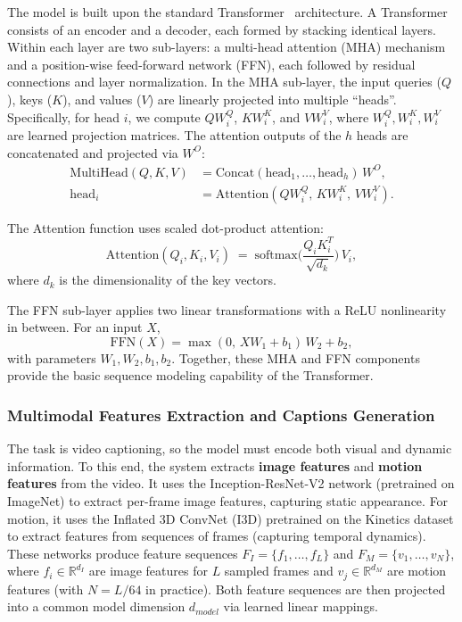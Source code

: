 The model is built upon the standard Transformer~\cite{attention_is_all_you_need} architecture. A Transformer consists of an encoder and a decoder, each formed by stacking identical layers. Within each layer are two sub-layers: a multi-head attention (MHA) mechanism and a position-wise feed-forward network (FFN), each followed by residual connections and layer normalization. In the MHA sub-layer, the input queries ($Q$), keys ($K$), and values ($V$) are linearly projected into multiple ``heads''. Specifically, for head $i$, we compute $Q W_i^Q$, $K W_i^K$, and $V W_i^V$, where $W_i^Q,W_i^K,W_i^V$ are learned projection matrices. The attention outputs of the $h$ heads are concatenated and projected via $W^O$:
\begin{equation}
\begin{split}
\mathrm{MultiHead}(Q,K,V)
  &= \mathrm{Concat}(\mathrm{head}_1,\dots,\mathrm{head}_h)\,W^O,\\
\mathrm{head}_i
  &= \mathrm{Attention}(QW_i^Q,\,KW_i^K,\,VW_i^V).
\end{split}
\label{eq:mha}
\end{equation}

The Attention function uses scaled dot-product attention:
$$
\mathrm{Attention}(Q_i,K_i,V_i) \;=\; \mathrm{softmax}\Big(\frac{Q_iK_i^T}{\sqrt{d_k}}\Big)\,V_i,
$$
where $d_k$ is the dimensionality of the key vectors.

The FFN sub-layer applies two linear transformations with a ReLU nonlinearity in between. For an input $X$,
$$
\mathrm{FFN}(X) = \max(0,\,XW_1 + b_1)\,W_2 + b_2,
$$
with parameters $W_1,W_2,b_1,b_2$. Together, these MHA and FFN components provide the basic sequence modeling capability of the Transformer.

\subsubsection{Multimodal Features Extraction and Captions Generation}

The task is video captioning, so the model must encode both visual and dynamic information. To this end, the system extracts \textbf{image features} and \textbf{motion features} from the video. It uses the Inception-ResNet-V2 network (pretrained on ImageNet) to extract per-frame image features, capturing static appearance. For motion, it uses the Inflated 3D ConvNet (I3D) pretrained on the Kinetics dataset to extract features from sequences of frames (capturing temporal dynamics). These networks produce feature sequences $F_I=\{f_1,\dots,f_L\}$ and $F_M=\{v_1,\dots,v_N\}$, where $f_i\in\mathbb{R}^{d_I}$ are image features for $L$ sampled frames and $v_j\in\mathbb{R}^{d_M}$ are motion features (with $N=L/64$ in practice). Both feature sequences are then projected into a common model dimension $d_{model}$ via learned linear mappings.


